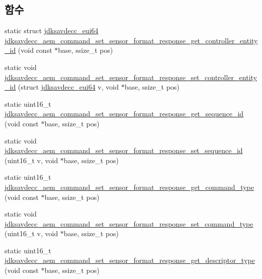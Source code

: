 \subsection*{함수}
\begin{DoxyCompactItemize}
\item 
static struct \hyperlink{structjdksavdecc__eui64}{jdksavdecc\+\_\+eui64} \hyperlink{group__command__set__sensor__format__response_gac99b423a2cab1e1f07af95b50550c654}{jdksavdecc\+\_\+aem\+\_\+command\+\_\+set\+\_\+sensor\+\_\+format\+\_\+response\+\_\+get\+\_\+controller\+\_\+entity\+\_\+id} (void const $\ast$base, ssize\+\_\+t pos)
\item 
static void \hyperlink{group__command__set__sensor__format__response_ga88f96c9ff95f85ff32646fbda6b244d0}{jdksavdecc\+\_\+aem\+\_\+command\+\_\+set\+\_\+sensor\+\_\+format\+\_\+response\+\_\+set\+\_\+controller\+\_\+entity\+\_\+id} (struct \hyperlink{structjdksavdecc__eui64}{jdksavdecc\+\_\+eui64} v, void $\ast$base, ssize\+\_\+t pos)
\item 
static uint16\+\_\+t \hyperlink{group__command__set__sensor__format__response_ga8c6ed09c034456addf8cf791f1d7536a}{jdksavdecc\+\_\+aem\+\_\+command\+\_\+set\+\_\+sensor\+\_\+format\+\_\+response\+\_\+get\+\_\+sequence\+\_\+id} (void const $\ast$base, ssize\+\_\+t pos)
\item 
static void \hyperlink{group__command__set__sensor__format__response_ga2706caf7e64d5aa06ec961056239647f}{jdksavdecc\+\_\+aem\+\_\+command\+\_\+set\+\_\+sensor\+\_\+format\+\_\+response\+\_\+set\+\_\+sequence\+\_\+id} (uint16\+\_\+t v, void $\ast$base, ssize\+\_\+t pos)
\item 
static uint16\+\_\+t \hyperlink{group__command__set__sensor__format__response_ga80929e320610830317fa293a47341116}{jdksavdecc\+\_\+aem\+\_\+command\+\_\+set\+\_\+sensor\+\_\+format\+\_\+response\+\_\+get\+\_\+command\+\_\+type} (void const $\ast$base, ssize\+\_\+t pos)
\item 
static void \hyperlink{group__command__set__sensor__format__response_ga2d8666397c42509e581d991fe2c3ca6c}{jdksavdecc\+\_\+aem\+\_\+command\+\_\+set\+\_\+sensor\+\_\+format\+\_\+response\+\_\+set\+\_\+command\+\_\+type} (uint16\+\_\+t v, void $\ast$base, ssize\+\_\+t pos)
\item 
static uint16\+\_\+t \hyperlink{group__command__set__sensor__format__response_ga6d6efc5ea01d2f023333e5fe9a8cf6f4}{jdksavdecc\+\_\+aem\+\_\+command\+\_\+set\+\_\+sensor\+\_\+format\+\_\+response\+\_\+get\+\_\+descriptor\+\_\+type} (void const $\ast$base, ssize\+\_\+t pos)
\item 

\end{DoxyCompactItemize}
